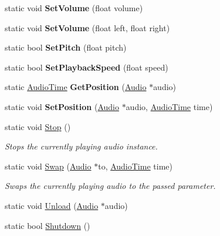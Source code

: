 \begin{DoxyCompactItemize}
\mbox{\label{class_audio_engine_a186a5976fb2f427c975313d45a7461c2}} 
static void {\bfseries Set\+Volume} (float volume)
\item 
\mbox{\label{class_audio_engine_a10f8993b8f75c450ed71933e0a2d8106}} 
static void {\bfseries Set\+Volume} (float left, float right)
\item 
\mbox{\label{class_audio_engine_a9ce9d1ee17f4fb04e6b1ab47262f15e4}} 
static bool {\bfseries Set\+Pitch} (float pitch)
\item 
\mbox{\label{class_audio_engine_aa832bfb517a10e1e0aa1193057b2749c}} 
static bool {\bfseries Set\+Playback\+Speed} (float speed)
\item 
\mbox{\label{class_audio_engine_a329395057a046b7e8096ceec22461a6a}} 
static \hyperlink{class_audio_time}{Audio\+Time} {\bfseries Get\+Position} (\hyperlink{class_audio}{Audio} $\ast$audio)
\item 
\mbox{\label{class_audio_engine_acd955e65a1f9d8dd3cd223270fcedcc6}} 
static void {\bfseries Set\+Position} (\hyperlink{class_audio}{Audio} $\ast$audio, \hyperlink{class_audio_time}{Audio\+Time} time)
\item 
\mbox{\label{class_audio_engine_a2033466e582a9c9d0d8ca7ada6223066}} 
static void \hyperlink{class_audio_engine_a2033466e582a9c9d0d8ca7ada6223066}{Stop} ()
\begin{DoxyCompactList}\small\item\em Stops the currently playing audio instance. \end{DoxyCompactList}\item 
static void \hyperlink{class_audio_engine_abc49a7e983821493bf5becc5ab25c6a0}{Swap} (\hyperlink{class_audio}{Audio} $\ast$to, \hyperlink{class_audio_time}{Audio\+Time} time)
\begin{DoxyCompactList}\small\item\em Swaps the currently playing audio to the passed parameter. \end{DoxyCompactList}\item 
static void \hyperlink{class_audio_engine_a4731748285d63c441eedab6b0e47440e}{Unload} (\hyperlink{class_audio}{Audio} $\ast$audio)
\item 
static bool \hyperlink{class_audio_engine_a745076bf5346972aecaf54ced0f5dfc6}{Shutdown} ()
\end{DoxyCompactItemize}


